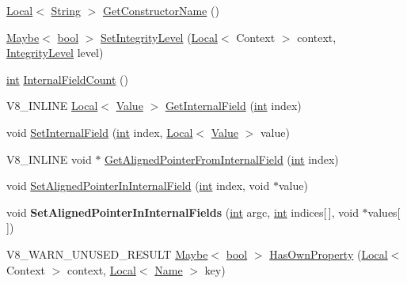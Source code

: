 \begin{DoxyCompactItemize}
\item 
\mbox{\hyperlink{classv8_1_1Local}{Local}}$<$ \mbox{\hyperlink{classv8_1_1String}{String}} $>$ \mbox{\hyperlink{classv8_1_1Object_adfa3382c230ccbd88f9be12e2512eab8}{Get\+Constructor\+Name}} ()
\item 
\mbox{\hyperlink{classv8_1_1Maybe}{Maybe}}$<$ \mbox{\hyperlink{classbool}{bool}} $>$ \mbox{\hyperlink{classv8_1_1Object_aa13da0b73aea74f9a58250aa0677b73c}{Set\+Integrity\+Level}} (\mbox{\hyperlink{classv8_1_1Local}{Local}}$<$ Context $>$ context, \mbox{\hyperlink{namespacev8_a02642d03ff1eecc2fd358626499c2e30}{Integrity\+Level}} level)
\item 
\mbox{\hyperlink{classint}{int}} \mbox{\hyperlink{classv8_1_1Object_aaec28576353eebe6fee113bce2718ecc}{Internal\+Field\+Count}} ()
\item 
V8\+\_\+\+I\+N\+L\+I\+NE \mbox{\hyperlink{classv8_1_1Local}{Local}}$<$ \mbox{\hyperlink{classv8_1_1Value}{Value}} $>$ \mbox{\hyperlink{classv8_1_1Object_aa3324fdf652d8ac3b2f27faa0559231d}{Get\+Internal\+Field}} (\mbox{\hyperlink{classint}{int}} index)
\item 
void \mbox{\hyperlink{classv8_1_1Object_aebf949a0592cebc144bb2f96bfb7ec72}{Set\+Internal\+Field}} (\mbox{\hyperlink{classint}{int}} index, \mbox{\hyperlink{classv8_1_1Local}{Local}}$<$ \mbox{\hyperlink{classv8_1_1Value}{Value}} $>$ value)
\item 
V8\+\_\+\+I\+N\+L\+I\+NE void $\ast$ \mbox{\hyperlink{classv8_1_1Object_a435f68bb7ef0f64dd522c5c910682448}{Get\+Aligned\+Pointer\+From\+Internal\+Field}} (\mbox{\hyperlink{classint}{int}} index)
\item 
void \mbox{\hyperlink{classv8_1_1Object_a0ccba69581f0b5e4e672bab90f26879b}{Set\+Aligned\+Pointer\+In\+Internal\+Field}} (\mbox{\hyperlink{classint}{int}} index, void $\ast$value)
\item 
\mbox{\label{classv8_1_1Object_af03a2f9b898b578048b9e1c313f28100}} 
void {\bfseries Set\+Aligned\+Pointer\+In\+Internal\+Fields} (\mbox{\hyperlink{classint}{int}} argc, \mbox{\hyperlink{classint}{int}} indices\mbox{[}$\,$\mbox{]}, void $\ast$values\mbox{[}$\,$\mbox{]})
\item 
V8\+\_\+\+W\+A\+R\+N\+\_\+\+U\+N\+U\+S\+E\+D\+\_\+\+R\+E\+S\+U\+LT \mbox{\hyperlink{classv8_1_1Maybe}{Maybe}}$<$ \mbox{\hyperlink{classbool}{bool}} $>$ \mbox{\hyperlink{classv8_1_1Object_acfe461c8e81a3d078d62ece594cb1994}{Has\+Own\+Property}} (\mbox{\hyperlink{classv8_1_1Local}{Local}}$<$ Context $>$ context, \mbox{\hyperlink{classv8_1_1Local}{Local}}$<$ \mbox{\hyperlink{classv8_1_1Name}{Name}} $>$ key)

\end{DoxyCompactItemize}
